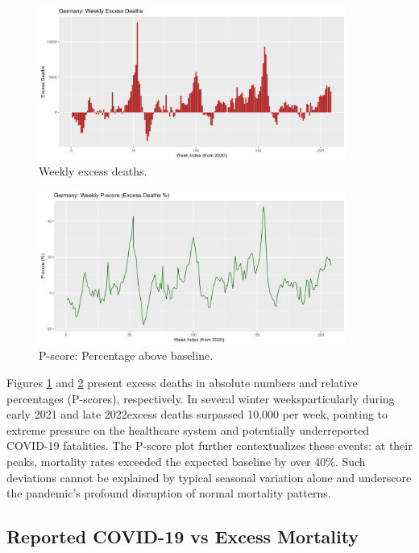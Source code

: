 \documentclass[a4paper,11pt]{article}
\begin{document}
\begin{figure}[h]
\centering
\includegraphics[width=0.9\textwidth]{Figure2-germany-excess-deaths.png}
\caption{Weekly excess deaths.}\label{f2}
\end{figure}

\begin{figure}[h]
\centering
\includegraphics[width=0.9\textwidth]{Figure3-germany-p-score.png}
\caption{P-score: Percentage above baseline.}\label{f3}
\end{figure}

Figures \ref{f2} and \ref{f3} present excess deaths in absolute numbers and relative percentages (P-scores), respectively. In several winter weeks\textemdash particularly during early 2021 and late 2022\textemdash excess deaths surpassed 10,000 per week, pointing to extreme pressure on the healthcare system and potentially underreported COVID-19 fatalities. The P-score plot further contextualizes these events: at their peaks, mortality rates exceeded the expected baseline by over 40\%. Such deviations cannot be explained by typical seasonal variation alone and underscore the pandemic’s profound disruption of normal mortality patterns.

\subsection{Reported COVID-19 vs Excess Mortality}
\end{document}
